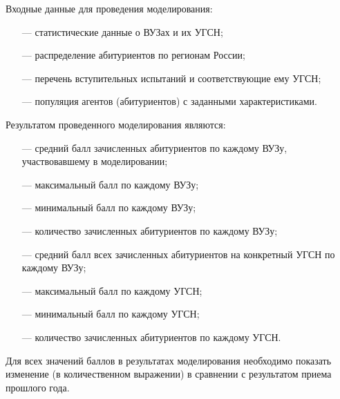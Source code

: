 Входные данные для проведения моделирования:

\begin{itemize}[leftmargin=1.6\parindent]
	\item[---] статистические данные о ВУЗах и их УГСН;
	\item[---] распределение абитуриентов по регионам России;
	\item[---] перечень вступительных испытаний и соответствующие ему УГСН;
	\item[---] популяция агентов (абитуриентов) с заданными характеристиками.

\end{itemize}

Результатом проведенного моделирования являются:

\begin{itemize}[leftmargin=1.6\parindent]
	\item[---] средний балл зачисленных абитуриентов по каждому ВУЗу, участвовавшему в моделировании;
	\item[---] максимальный балл по каждому ВУЗу;
	\item[---] минимальный балл по каждому ВУЗу;
	\item[---] количество зачисленных абитуриентов по каждому ВУЗу;
	\item[---] средний балл всех зачисленных абитуриентов на конкретный УГСН по каждому ВУЗу;
	\item[---] максимальный балл по каждому УГСН;
	\item[---] минимальный балл по каждому УГСН;
	\item[---] количество зачисленных абитуриентов по каждому УГСН.

\end{itemize}

Для всех значений баллов в результатах моделирования необходимо показать изменение (в количественном выражении) в сравнении с результатом приема прошлого года.















\pagebreak